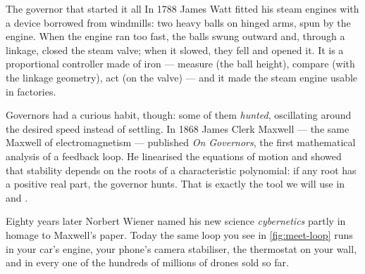 \begin{curiosity}{The governor that started it all}
In 1788 James Watt fitted his steam engines with a device borrowed from windmills: two heavy balls on hinged arms, spun by the engine. When the engine ran too fast, the balls swung outward and, through a linkage, closed the steam valve; when it slowed, they fell and opened it. It is a proportional controller made of iron — measure (the ball height), compare (with the linkage geometry), act (on the valve) — and it made the steam engine usable in factories.

Governors had a curious habit, though: some of them \emph{hunted}, oscillating around the desired speed instead of settling. In 1868 James Clerk Maxwell — the same Maxwell of electromagnetism — published \emph{On Governors}, the first mathematical analysis of a feedback loop. He linearised the equations of motion and showed that stability depends on the roots of a characteristic polynomial: if any root has a positive real part, the governor hunts. That is exactly the tool we will use in  and .

Eighty years later Norbert Wiener named his new science \emph{cybernetics} partly in homage to Maxwell's paper. Today the same loop you see in \cref{fig:meet-loop} runs in your car's engine, your phone's camera stabiliser, the thermostat on your wall, and in every one of the hundreds of millions of drones sold so far.
\end{curiosity}

